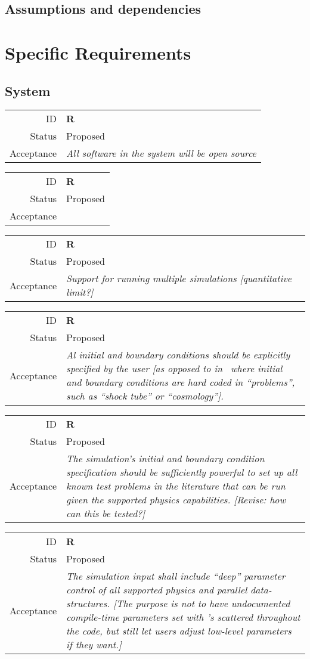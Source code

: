 \documentclass{book}
\newcommand{\req}[3]{
\begin{tabular}{rl}
ID & \textbf{R#1} \\
Status & \textsf{#2} \\
Acceptance & \textit{#3}
\end{tabular}
}
\begin{document}
\section{Assumptions and dependencies}

\chapter{Specific Requirements} \label{c:req}

\section{System}

\req
  {}
  {Proposed}
%
  {All software in the system will be open source}

\req
  {}
  {Proposed}
%
  {}


\req
  {}
  {Proposed}
%
  {Support for running multiple simulations
  [quantitative limit?]}

\req
  {}
  {Proposed}
%
  {Al initial and boundary conditions should be explicitly
  specified by the user [as opposed to in \enzo\ where
  initial and boundary conditions are hard coded in ``problems'',
  such as ``shock tube'' or ``cosmology''].}

\req
  {}
  {Proposed}
%
  {The simulation's initial and boundary condition specification
   should be sufficiently powerful to set up all known test problems
   in the literature that can be run given the supported physics
   capabilities. [Revise: how can this be tested?]}

\req
  {}
  {Proposed}
%
  {The simulation input shall include ``deep'' parameter control of
    all supported physics and parallel data-structures. [The purpose
      is not to have undocumented compile-time parameters set with
      \code{\#define}'s scattered throughout the code, but still let
      users adjust low-level parameters if they want.]}
\end{document}
